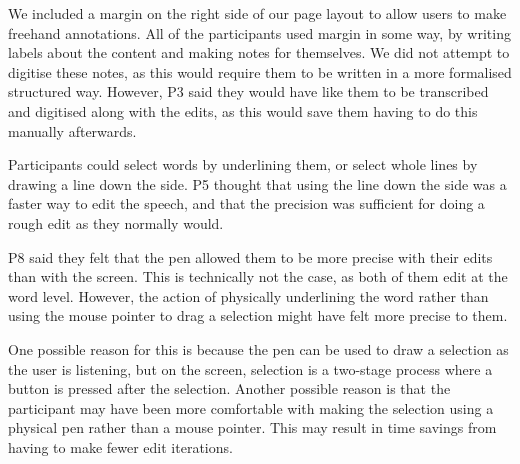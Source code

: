 
We included a margin on the right side of our page layout to allow users to make freehand annotations. All of the
participants used margin in some way, by writing labels about the content and making notes for themselves.  We did not
attempt to digitise these notes, as this would require them to be written in a more formalised structured way. However,
P3 said they would have like them to be transcribed and digitised along with the edits, as this would save them having
to do this manually afterwards.





Participants could select words by underlining them, or select whole lines by drawing a line down the side. P5 thought
that using the line down the side was a faster way to edit the speech, and that the precision was sufficient for
doing a rough edit as they normally would.


P8 said they felt that the pen allowed them to be more precise with their edits than with the screen. This is
technically not the case, as both of them edit at the word level. However, the action of physically underlining the
word rather than using the mouse pointer to drag a selection might have felt more precise to them.

One possible reason for this is because the pen can be used to draw a selection as the user is listening, but on the
screen, selection is a two-stage process where a button is pressed after the selection. Another possible reason is that
the participant may have been more comfortable with making the selection using a physical pen rather than a mouse
pointer.  This may result in time savings from having to make fewer edit iterations.

